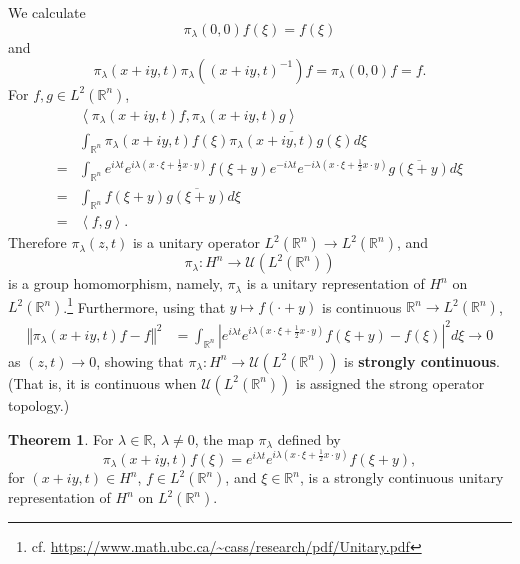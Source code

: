 \documentclass{article}
\newcommand{\inner}[2]{\left\langle #1, #2 \right\rangle}
\newcommand{\norm}[1]{\left\Vert #1 \right\Vert}
\theoremstyle{definition}
\newtheorem{theorem}{Theorem}
\theoremstyle{definition}
\begin{document}
We calculate
\[
\pi_\lambda(0,0) f(\xi) = f(\xi)
\]
and
\[
 \pi_\lambda(x+iy,t) \pi_\lambda((x+iy,t)^{-1}) f = 
\pi_\lambda(0,0)f = f.
\]
For $f,g \in L^2(\mathbb{R}^n)$,
\[
\begin{split}
&\inner{\pi_\lambda(x+iy,t)f}{\pi_\lambda(x+iy,t)g}\\
&\int_{\mathbb{R}^n} \pi_\lambda(x+iy,t)f(\xi) \overline{\pi_\lambda(x+iy,t)g(\xi)} d\xi\\
=&\int_{\mathbb{R}^n} 
e^{i\lambda t} e^{i\lambda\left(x\cdot \xi+\frac{1}{2}x\cdot y\right)} f(\xi+y)
e^{-i\lambda t} e^{-i\lambda\left(x\cdot \xi+\frac{1}{2}x\cdot y\right)} \overline{g(\xi+y)}
d\xi\\
=&\int_{\mathbb{R}^n} f(\xi+y) \overline{g(\xi+y)} d\xi\\
=&\inner{f}{g}.
\end{split}
\]
Therefore $\pi_\lambda(z,t)$ is a unitary operator $L^2(\mathbb{R}^n) \to L^2(\mathbb{R}^n)$, and
\[
\pi_\lambda:H^n \to \mathscr{U}(L^2(\mathbb{R}^n))
\]
 is a group homomorphism, namely, $\pi_\lambda$ is a unitary
representation of $H^n$ on $L^2(\mathbb{R}^n)$.\footnote{cf. \url{https://www.math.ubc.ca/~cass/research/pdf/Unitary.pdf}}
Furthermore, using that $y \mapsto f(\cdot+y)$ is continuous $\mathbb{R}^n \to L^2(\mathbb{R}^n)$, 
\begin{align*}
\norm{\pi_\lambda(x+iy,t) f -f}^2
&=\int_{\mathbb{R}^n} | e^{i\lambda t} e^{i\lambda\left(x\cdot \xi+\frac{1}{2}x\cdot y\right)} f(\xi+y) - f(\xi)|^2 d\xi \to 0
\end{align*}
as $(z,t) \to 0$, showing that $\pi_\lambda:H^n \to \mathscr{U}(L^2(\mathbb{R}^n))$ is \textbf{strongly continuous}. (That is, it is continuous when
$\mathscr{U}(L^2(\mathbb{R}^n))$ is assigned the strong
operator topology.)

\begin{theorem}
For $\lambda \in \mathbb{R}$, $\lambda \neq 0$, the map $\pi_\lambda$ defined by
\[
\pi_\lambda(x+iy,t)f(\xi) = e^{i\lambda t} e^{i\lambda\left(x\cdot \xi+\frac{1}{2}x\cdot y\right)} f(\xi+y),
\]
for $(x+iy,t) \in H^n$, $f \in L^2(\mathbb{R}^n)$, and $\xi \in \mathbb{R}^n$, is  a strongly continuous unitary representation of $H^n$
on $L^2(\mathbb{R}^n)$. 
\end{theorem}
\end{document}
